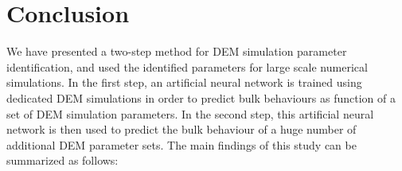 
\part{Conclusion}
\label{par:conclusion}

We have presented a two-step method for \acs{DEM} simulation parameter
identification, and used the identified parameters for large scale numerical
simulations.
In the first step, an artificial neural network is
trained using dedicated \acs{DEM} simulations in order to predict bulk
behaviours as function of a set of \acs{DEM} simulation parameters.
In the second step, this artificial neural network is then used
to predict the bulk behaviour of a huge number of additional \acs{DEM} parameter
sets.
The main findings of this study can be summarized as follows:
